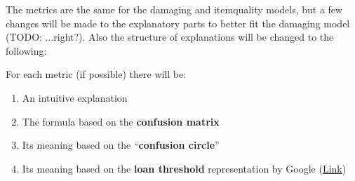 \documentclass[12pt,a4paper]{article}
\begin{document}
\begin{description}
\item The metrics are the same for the damaging and itemquality models, but a few changes will be made to the explanatory parts to better fit the damaging model (TODO: ...right?). Also the structure of explanations will be changed to the following:
\item For each metric (if possible) there will be:
\begin{enumerate}
\item An intuitive explanation
\item The formula based on the \textbf{confusion matrix}
\item Its meaning based on the ``\textbf{confusion circle}''
\item Its meaning based on the \textbf{loan threshold} representation by Google (\href{https://research.google.com/bigpicture/attacking-discrimination-in-ml/}{Link})
\end{enumerate}
\end{description}
\end{document}
